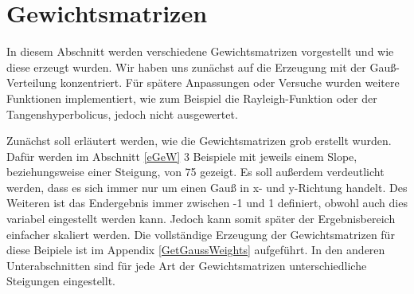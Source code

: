 \section{Gewichtsmatrizen\label{gewichtsmatrizenSection}}
In diesem Abschnitt werden verschiedene Gewichtsmatrizen vorgestellt und wie diese erzeugt wurden. Wir haben uns zunächst auf die Erzeugung mit der Gauß-Verteilung konzentriert. Für spätere Anpassungen oder Versuche wurden weitere Funktionen implementiert, wie zum Beispiel die Rayleigh-Funktion oder der Tangenshyperbolicus, jedoch nicht ausgewertet.

Zunächst soll erläutert werden, wie die Gewichtsmatrizen grob erstellt wurden. Dafür werden im Abschnitt \ref{eGeW} 3 Beispiele mit jeweils einem Slope, beziehungsweise einer Steigung, von 75 gezeigt. Es soll außerdem verdeutlicht werden, dass es sich immer nur um einen Gauß in x- und y-Richtung handelt. Des Weiteren ist das Endergebnis immer zwischen -1 und 1 definiert, obwohl auch dies variabel eingestellt werden kann. Jedoch kann somit später der Ergebnisbereich einfacher skaliert werden. Die vollständige Erzeugung der Gewichtsmatrizen für diese Beipiele ist im Appendix \ref{GetGaussWeights} aufgeführt. In den anderen Unterabschnitten sind für jede Art der Gewichtsmatrizen unterschiedliche Steigungen eingestellt.

\newpage
